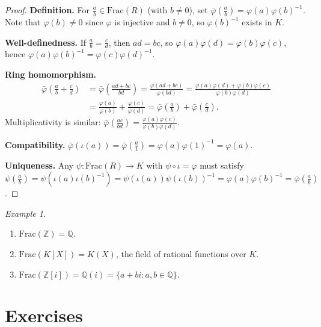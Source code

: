 \documentclass[12pt,a4paper,openany]{book}
\theoremstyle{definition}
\theoremstyle{remark}
\newtheorem{example}{Example}[chapter]
\begin{document}
\begin{proof}
\textbf{Definition.} For $\frac{a}{b}\in\mathrm{Frac}(R)$ (with $b\neq 0$), set $\bar{\varphi}\!\left(\frac{a}{b}\right)=\varphi(a)\varphi(b)^{-1}$. Note that $\varphi(b)\neq 0$ since $\varphi$ is injective and $b\neq 0$, so $\varphi(b)^{-1}$ exists in $K$.

\textbf{Well-definedness.} If $\frac{a}{b}=\frac{c}{d}$, then $ad=bc$, so $\varphi(a)\varphi(d)=\varphi(b)\varphi(c)$, hence $\varphi(a)\varphi(b)^{-1}=\varphi(c)\varphi(d)^{-1}$.

\textbf{Ring homomorphism.}
\begin{align*}
    \bar{\varphi}\!\left(\frac{a}{b}+\frac{c}{d}\right) &= \bar{\varphi}\!\left(\frac{ad+bc}{bd}\right)=\frac{\varphi(ad+bc)}{\varphi(bd)}=\frac{\varphi(a)\varphi(d)+\varphi(b)\varphi(c)}{\varphi(b)\varphi(d)} \\
    &= \frac{\varphi(a)}{\varphi(b)}+\frac{\varphi(c)}{\varphi(d)} = \bar{\varphi}\!\left(\frac{a}{b}\right)+\bar{\varphi}\!\left(\frac{c}{d}\right).
\end{align*}
Multiplicativity is similar: $\bar{\varphi}\!\left(\frac{ac}{bd}\right)=\frac{\varphi(a)\varphi(c)}{\varphi(b)\varphi(d)}$.

\textbf{Compatibility.} $\bar{\varphi}(\iota(a))=\bar{\varphi}\!\left(\frac{a}{1}\right)=\varphi(a)\varphi(1)^{-1}=\varphi(a)$.

\textbf{Uniqueness.} Any $\psi\colon\mathrm{Frac}(R)\to K$ with $\psi\circ\iota=\varphi$ must satisfy $\psi\!\left(\frac{a}{b}\right)=\psi(\iota(a)\iota(b)^{-1})=\psi(\iota(a))\psi(\iota(b))^{-1}=\varphi(a)\varphi(b)^{-1}=\bar{\varphi}\!\left(\frac{a}{b}\right)$.
\end{proof}

\begin{example}\label{ex:field-of-fractions}
\begin{enumerate}[label=(\alph*)]
    \item $\mathrm{Frac}(\mathbb{Z})=\mathbb{Q}$.
    \item $\mathrm{Frac}(K[X])=K(X)$, the field of rational functions over $K$.
    \item $\mathrm{Frac}(\mathbb{Z}[i])=\mathbb{Q}(i)=\{a+bi : a,b\in\mathbb{Q}\}$.
\end{enumerate}
\end{example}

\section{Exercises}\label{sec:quotient-exercises}
\end{document}
